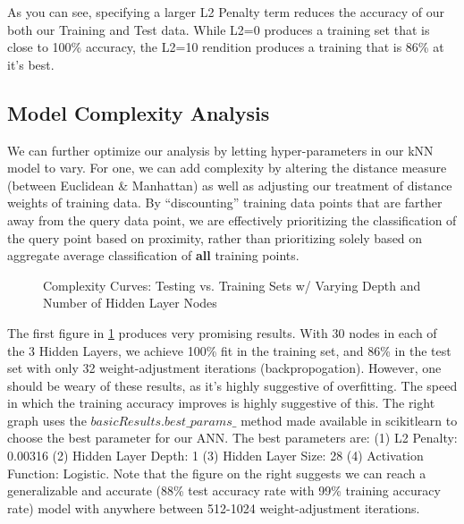 \documentclass[letterpaper,12pt]{article}
\begin{document}
As you can see, specifying a larger L2 Penalty term reduces the accuracy of our both our Training and Test data.  While L2=0 produces a training set that is close to 100\% accuracy, the L2=10 rendition produces a training that is 86\% at it's best.

\subsection{Model Complexity Analysis}
We can further optimize our analysis by letting hyper-parameters in our kNN model to vary.  For one, we can add complexity by altering the distance measure (between Euclidean \& Manhattan) as well as adjusting our treatment of distance weights of training data.  By ``discounting'' training data points that are farther away from the query data point, we are effectively prioritizing the classification of the query point based on proximity, rather than prioritizing solely based on aggregate average classification of \textbf{all} training points.  

\begin{figure} %
  \centering
  \hspace{8pt}%
  \caption{Complexity Curves:  Testing vs. Training Sets w/ Varying Depth and Number of Hidden Layer Nodes}\label{fig:kNN Complexity Curves}
\end{figure}

The first figure in \ref{fig:kNN Complexity Curves} produces very promising results.  With 30 nodes in each of the 3 Hidden Layers, we achieve 100\% fit in the training set, and 86\% in the test set with only 32 weight-adjustment iterations (backpropogation).  However, one should be weary of these results, as it's highly suggestive of overfitting.  The speed in which the training accuracy improves is highly suggestive of this.  The right graph uses the $basicResults.best\_params\_$ method made available in scikitlearn to choose the best parameter for our ANN.  The best parameters are:  (1) L2 Penalty: 0.00316 (2) Hidden Layer Depth: 1 (3) Hidden Layer Size: 28 (4) Activation Function: Logistic.  Note that the figure on the right suggests we can reach a generalizable and accurate (88\% test accuracy rate with 99\% training accuracy rate) model with anywhere between 512-1024 weight-adjustment iterations.  
\end{document}
